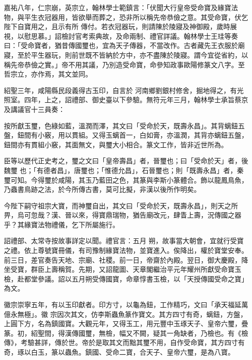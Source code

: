 \begin{pinyinscope}
 嘉祐八年，仁宗崩，英宗立，翰林學士範鎮言：「伏聞大行皇帝受命寶及緣寶法物，與平生衣冠器用，皆欲舉而葬之，恐非所以稱先帝恭儉之意。其受命寶，伏乞陛下自寶用之，且示有所
 傳付。若衣冠器玩，則請陳於陵寢及神御殿，歲時展視，以慰思慕。」詔檢討官考索典故，及命兩制、禮官詳議。翰林學士王珪等奏曰：「受命寶者，猶昔傳國璽也，宜為天子傳器，不當改作。古者藏先王衣服於廟寢，至於平生器玩，則前世既不皆納於方中，亦不盡陳於陵寢。謂今宜從省約，以稱先帝恭儉之實。」帝不用其議，乃別造受命寶，命參知政事歐陽修篆文八字。至哲宗立，亦作焉，其文並同。



 紹聖三年，咸陽縣民段義得古玉印，自言於
 河南鄉劉銀村修舍，掘地得之，有光照室。四年，上之，詔禮部、御史臺以下參驗。無符元年三月，翰林學士承旨蔡京及講議官十三員奏：



 按所獻玉璽，色綠如藍，溫潤而澤，其文曰「受命於天，既壽永昌」。其背螭鈕五盤，鈕間有小竅，用以貫組。又得玉螭首一，白如膏，亦溫潤，其背亦螭鈕五盤，鈕間亦有貫組小竅，其面無文，與璽大小相合。篆文工作，皆非近世所為。



 臣等以歷代正史考之，璽之文曰「皇帝壽昌」者，晉璽也；曰「受命於天」者，後魏璽
 也；「有德者昌」，唐璽也；「惟德允昌」，石晉璽也；則「既壽永昌」者，秦璽可知。今得璽於咸陽，其玉乃藍田之色，其篆與李斯小篆體合。飾以龍鳳鳥魚，乃蟲書鳥跡之法，於今所傳古書，莫可比擬，非漢以後所作明矣。



 今陛下嗣守祖宗大寶，而神璽自出，其文曰「受命於天，既壽永昌」，則天之所畀，烏可忽哉？漢、晉以來，得寶鼎瑞物，猶告廟改元，肆眚上壽，況傳國之器乎？其緣寶法物禮儀，乞下所屬施行。



 詔禮部、太常寺按故事詳定以聞。禮官言：五月
 朔，故事當大朝會，宜就行受寶之禮。依上尊號寶冊儀，有司豫制緣寶法物，並寶進入。俟降出，權於寶堂安奉。前三日，差官奏告天地、宗廟、社稷。前一日，帝齋於內殿。翌日，御大慶殿，降坐受寶，群臣上壽稱賀。先期，又詔龍圖、天章閣繼治平元年耀州所獻受命寶玉檢，赴都堂參議。詔以五月朔受傳國寶，命章惇書玉檢，以「天授傳國受命之寶」為文。



 徽宗崇寧五年，有以玉印獻者。印方寸，以龜為鈕，工作精巧，文曰「承天福延萬億永無極」。徽
 宗因次其文，仿李斯蟲魚篆作寶文。其方四寸有奇，螭鈕，方盤，上圓下方，名為鎮國寶。大觀元年，又得玉工，用元豐中玉琢天子、皇帝六璽，疊篆。初，紹聖間，得漢傳國璽，無檢，幅又不闕，疑其一角缺者，乃檢也。有《檢傳》，考驗甚詳，傳於世。帝於是取其文而黜其璽不用，自作受命寶，其方四寸有奇，琢以白玉，篆以蟲魚。鎮國、受命二寶，合天子、皇帝六璽，是為八寶。




\end{pinyinscope}
